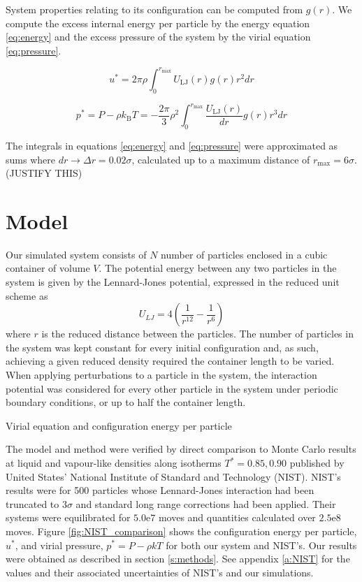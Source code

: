 \documentclass[10pt, twocolumn]{revtex4}    %
\begin{document}
System properties relating to its configuration can be computed from $g(r)$. We compute the excess internal energy per particle by the energy equation \ref{eq:energy} and the excess pressure of the system by the virial equation \ref{eq:pressure}.

\begin{equation}
u^{*} = 2\pi{}\rho{}\int_{0}^{r_\text{max}}U_\text{LJ}(r)g(r)r^{2}dr
\label{eq:energy}
\end{equation}

\begin{equation}
p^{*} = P - \rho{}k_\text{B}T = - \frac{2\pi}{3}\rho{}^{2} \int_{0}^{r_\text{max}}\frac{U_\text{LJ}(r)}{dr}g(r)r^{3}dr
\label{eq:pressure}
\end{equation}

The integrals in equations \ref{eq:energy} and \ref{eq:pressure} were approximated as sums where $dr \rightarrow{} \Delta{}r = 0.02\sigma{}$, calculated up to a maximum distance of $r_\text{max} = 6\sigma{}$. (JUSTIFY THIS)



\section{Model} \label{s:model}
Our simulated system consists of $N$ number of particles enclosed in a cubic container of volume $V$. The potential energy between any two particles in the system is given by the Lennard-Jones potential, expressed in the reduced unit scheme as
\begin{equation}
U_{LJ} = 4\left(\frac{1}{r^{12}}-\frac{1}{r^{6}}\right)
\end{equation}
where $r$ is the reduced distance between the particles.
The number of particles in the system was kept constant for every initial configuration and, as such, achieving a given reduced density required the container length to be varied. When applying perturbations to a particle in the system, the interaction potential was considered for every other particle in the system under periodic boundary conditions, or up to half the container length.

Virial equation and configuration energy per particle


The model and method were verified by direct comparison to Monte Carlo results at liquid and vapour-like densities along isotherms $T^{*}=0.85, 0.90$ published by United States' National Institute of Standard and Technology (NIST). NIST's results were for 500 particles whose Lennard-Jones interaction had been truncated to $3\sigma{}$ and standard long range corrections had been applied. Their systems were equilibrated for $5.0\text{e}7$ moves and quantities calculated over $2.5\text{e}8$ moves. Figure \ref{fig:NIST_comparison} shows the configuration energy per particle, $u^*$, and virial pressure, $p^{*} = P - \rho{}kT$ for both our system and NIST's. Our results were obtained as described in section \ref{s:methods}. See appendix \ref{a:NIST} for the values and their associated uncertainties of NIST's and our simulations.
\end{document}
